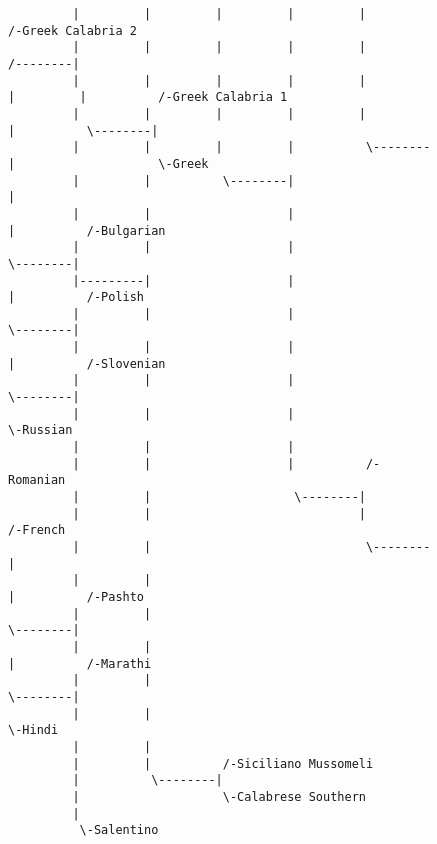 \begin{figure}[!htb]
\begin{center}
{\begin{verbatim}
         |         |         |         |         |                    /-Greek Calabria 2
         |         |         |         |         |          /--------|
         |         |         |         |         |         |         |          /-Greek Calabria 1
         |         |         |         |         |         |          \--------|
         |         |         |         |          \--------|                    \-Greek
         |         |          \--------|                   |
         |         |                   |                   |          /-Bulgarian
         |         |                   |                    \--------|
         |---------|                   |                             |          /-Polish
         |         |                   |                              \--------|
         |         |                   |                                       |          /-Slovenian
         |         |                   |                                        \--------|
         |         |                   |                                                  \-Russian
         |         |                   |
         |         |                   |          /-Romanian
         |         |                    \--------|
         |         |                             |          /-French
         |         |                              \--------|
         |         |                                       |          /-Pashto
         |         |                                        \--------|
         |         |                                                 |          /-Marathi
         |         |                                                  \--------|
         |         |                                                            \-Hindi
         |         |
         |         |          /-Siciliano Mussomeli
         |          \--------|
         |                    \-Calabrese Southern
         |
          \-Salentino

\end{verbatim}
}
\label{...}
\end{center}
\end{figure}
